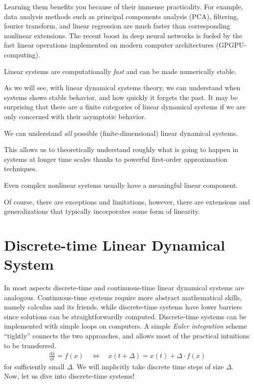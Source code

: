 \documentclass[a4paper,11pt]{exam}
\newcounter{ct}
\begin{document}
Learning them benefits you because of their immense practicality.
For example, data analysis methods such as principal components analysis (PCA), filtering, fourier transform, and linear regression are much faster than corresponding nonlinear extensions.
The recent boost in deep neural networks is fueled by the fast linear operations implemented on modern computer architectures (GPGPU-computing).
\begin{tcolorbox}[colback=black!1!,title=Saves you time and the planet]
    Linear systems are computationally \emph{fast} and can be made numerically stable.
\end{tcolorbox}
As we will see, with linear dynamical systems theory, we can understand when systems shows stable behavior, and how quickly it forgets the past.
It may be surprising that there are a finite categories of linear dynamical systems if we are only concerned with their asymptotic behavior.
\begin{tcolorbox}[colback=black!1!,title=Easy asymptotic theory]
    We can understand \emph{all} possible (finite-dimensional) linear dynamical systems.
\end{tcolorbox}
This allows us to theoretically understand roughly what is going to happen in systems at longer time scales thanks to powerful first-order approximation techniques.
\begin{tcolorbox}[colback=black!1!,title=Linearize (locally)]
    Even complex nonlinear systems usually have a meaningful linear component.
\end{tcolorbox}
Of course, there are exceptions and limitations, however, there are extensions and generalizations that typically incorporates some form of linearity.

\section{Discrete-time Linear Dynamical System}
In most aspects discrete-time and continuous-time linear dynamical systems are analogous.
Continuous-time systems require more abstract mathematical skills, namely calculus and its friends, while discrete-time systems have lower barriers since solutions can be straightforwardly computed.
Discrete-time systems can be implemented with simple loops on computers.
A simple \emph{Euler integration} scheme ``tightly'' connects the two approaches, and allows most of the practical intuitions to be transferred.
\begin{align}\label{eq:euler}
\frac{\mathrm{d}x}{\mathrm{d}t} = f(x) \quad \Longleftrightarrow \quad
x(t + \Delta) = x(t) + \Delta \cdot f(x)
\end{align}
for sufficiently small $\Delta$.
We will implicitly take discrete time steps of size $\Delta$.
Now, let us dive into discrete-time systems!
\end{document}
